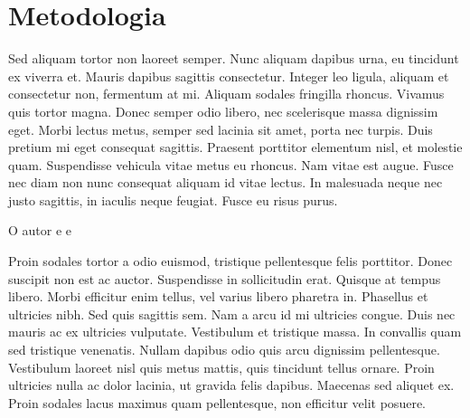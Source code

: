 \chapter{Metodologia}
\label{chap:metodologia}

Sed aliquam tortor non laoreet semper. Nunc aliquam dapibus urna, eu tincidunt ex viverra et. Mauris dapibus sagittis consectetur. Integer leo ligula, aliquam et consectetur non, fermentum at mi. Aliquam sodales fringilla rhoncus. Vivamus quis tortor magna. Donec semper odio libero, nec scelerisque massa dignissim eget. Morbi lectus metus, semper sed lacinia sit amet, porta nec turpis. Duis pretium mi eget consequat sagittis. Praesent porttitor elementum nisl, et molestie quam. Suspendisse vehicula vitae metus eu rhoncus. Nam vitae est augue. Fusce nec diam non nunc consequat aliquam id vitae lectus. In malesuada neque nec justo sagittis, in iaculis neque feugiat. Fusce eu risus purus.

O autor \cite{lamport1986latex} e \cite{Maia2011} e \cite{ibge23} 

Proin sodales tortor a odio euismod, tristique pellentesque felis porttitor. Donec suscipit non est ac auctor. Suspendisse in sollicitudin erat. Quisque at tempus libero. Morbi efficitur enim tellus, vel varius libero pharetra in. Phasellus et ultricies nibh. Sed quis sagittis sem. Nam a arcu id mi ultricies congue. Duis nec mauris ac ex ultricies vulputate. Vestibulum et tristique massa. In convallis quam sed tristique venenatis. Nullam dapibus odio quis arcu dignissim pellentesque. Vestibulum laoreet nisl quis metus mattis, quis tincidunt tellus ornare. Proin ultricies nulla ac dolor lacinia, ut gravida felis dapibus. Maecenas sed aliquet ex. Proin sodales lacus maximus quam pellentesque, non efficitur velit posuere.

\begin{table}[ht!]
\end{table}



